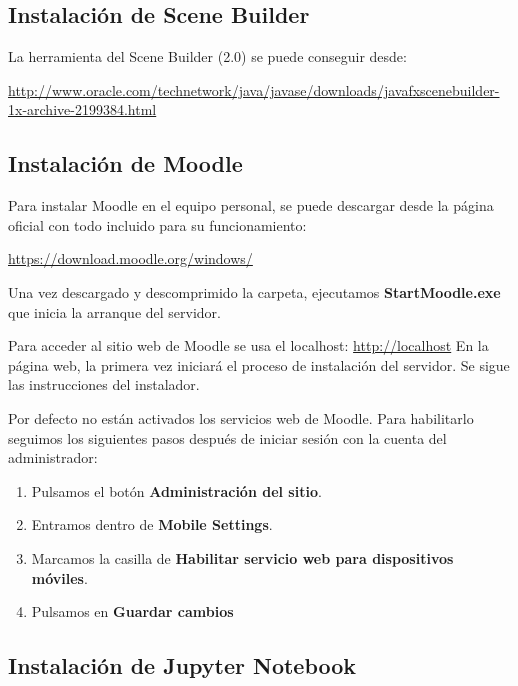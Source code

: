 \subsection{Instalación de Scene Builder}

La herramienta del Scene Builder (2.0) se puede conseguir desde: 

\href{http://www.oracle.com/technetwork/java/javase/downloads/javafxscenebuilder-1x-archive-2199384.html}{http://www.oracle.com/technetwork/java/javase/downloads/javafxscenebuilder-1x-archive-2199384.html}

\subsection{Instalación de Moodle}

Para instalar Moodle en el equipo personal, se puede descargar desde la página oficial con todo incluido para su funcionamiento:

\href{https://download.moodle.org/windows/}{https://download.moodle.org/windows/}

Una vez descargado y descomprimido la carpeta, ejecutamos \textbf{StartMoodle.exe} que inicia la  arranque del servidor.

Para acceder al sitio web de Moodle se usa el localhost: \href{http://localhost}{http://localhost}
En la página web, la primera vez iniciará el proceso de instalación del servidor. Se sigue las instrucciones del instalador.

Por defecto no están activados los servicios web de Moodle. Para habilitarlo seguimos los siguientes pasos después de iniciar sesión con la cuenta del administrador:

\begin{enumerate}
	
	\item Pulsamos el botón \textbf{Administración del sitio}.
	\item Entramos dentro de \textbf{Mobile Settings}.
	\item Marcamos la casilla de \textbf{Habilitar servicio web para dispositivos móviles}.
	\item Pulsamos en \textbf{Guardar cambios}
\end{enumerate}

\subsection{Instalación de Jupyter Notebook}

